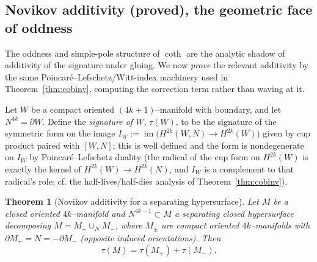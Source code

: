 \documentclass[12pt]{article}
\newtheorem{theorem}{Theorem}
\theoremstyle{definition}
\begin{document}
\subsection*{Novikov additivity (proved), the geometric face of oddness}

The oddness and simple-pole structure of $\coth$ are the analytic shadow of additivity of
the signature under gluing. We now \emph{prove} the relevant additivity by the same
Poincar\'e--Lefschetz/Witt-index machinery used in Theorem~\ref{thm:cobinv}, computing the
correction term rather than waving at it.

Let $W$ be a compact oriented $(4k{+}1)$--manifold with boundary, and let $N^{4k}=\partial W$.
Define the \emph{signature of $W$}, $\tau(W)$, to be the signature of the symmetric form
on the image $I_W:=\operatorname{im}\big(H^{2k}(W,N)\to H^{2k}(W)\big)$ given by cup product
paired with $[W,N]$; this is well defined and the form is nondegenerate on $I_W$ by
Poincar\'e--Lefschetz duality (the radical of the cup form on $H^{2k}(W)$ is exactly the
kernel of $H^{2k}(W)\to H^{2k}(N)$, and $I_W$ is a complement to that radical's role; cf.
the half-lives/half-dies analysis of Theorem~\ref{thm:cobinv}).

\begin{theorem}[Novikov additivity for a separating hypersurface]\label{thm:novikov}
Let $M$ be a closed oriented $4k$--manifold and $N^{4k-1}\subset M$ a separating closed
hypersurface decomposing $M=M_+\cup_N M_-$, where $M_\pm$ are compact oriented
$4k$--manifolds with $\partial M_+=N=-\partial M_-$ (opposite induced orientations). Then
\[
\tau(M)=\tau(M_+)+\tau(M_-).
\tag{13}\label{eq:novikov}
\]
\end{theorem}
\end{document}
